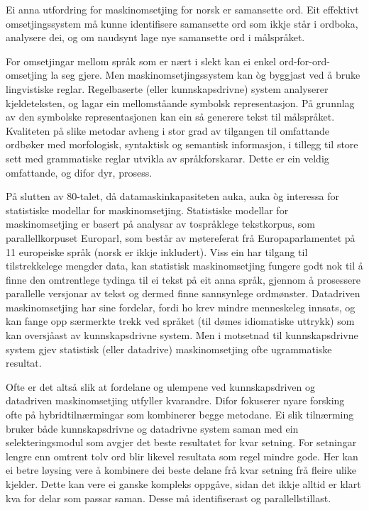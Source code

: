 \begin{multicols}{2}
Ei anna utfordring for maskinomsetjing for norsk er samansette ord. Eit effektivt omsetjingssystem må kunne identifisere samansette ord som ikkje står i ordboka, analysere dei, og om naudsynt lage nye samansette ord i målspråket.

For omsetjingar mellom språk som er nært i slekt kan ei enkel ord-for-ord-omsetjing la seg gjere. Men maskinomsetjingssystem kan òg byggjast ved å bruke lingvistiske reglar. Regelbaserte (eller kunnskapsdrivne) system analyserer kjeldeteksten, og lagar ein mellomståande symbolsk representasjon. På grunnlag av den symbolske representasjonen kan ein så generere tekst til målspråket. Kvaliteten på slike metodar avheng i stor grad av tilgangen til omfattande ordbøker med morfologisk, syntaktisk og semantisk informasjon, i tillegg til store sett med grammatiske reglar utvikla av språkforskarar. Dette er ein veldig omfattande, og difor dyr, prosess.

På slutten av 80-talet, då datamaskinkapasiteten auka, auka òg interessa for statistiske modellar for maskinomsetjing. Statistiske modellar for maskinomsetjing er basert på analysar av tospråklege tekstkorpus, som parallellkorpuset Europarl, som består av møtereferat frå Europaparlamentet på 11 europeiske språk 
(norsk er ikkje inkludert).
Viss ein har tilgang til tilstrekkelege mengder data, kan statistisk maskinomsetjing fungere godt nok til å finne den omtrentlege tydinga til ei tekst på eit anna språk, gjennom å prosessere parallelle versjonar av tekst og dermed finne sannsynlege ordmønster. Datadriven maskinomsetjing har sine fordelar, fordi ho krev mindre menneskeleg innsats, og kan fange opp særmerkte trekk ved språket (til dømes idiomatiske uttrykk) som kan oversjåast av kunnskapsdrivne system. Men i motsetnad til kunnskapsdrivne system gjev statistisk (eller datadrive) maskinomsetjing ofte ugrammatiske resultat.  

Ofte er det altså slik at fordelane og ulempene ved kunnskapsdriven og datadriven maskinomsetjing utfyller kvarandre. Difor fokuserer nyare forsking ofte på hybridtilnærmingar som kombinerer begge metodane. Ei slik tilnærming bruker både kunnskapsdrivne og datadrivne system saman med ein selekteringsmodul som avgjer det beste resultatet for kvar setning. For setningar lengre enn omtrent tolv ord blir likevel resultata som regel mindre gode. Her kan ei betre løysing vere å kombinere dei beste delane frå kvar setning frå fleire ulike kjelder. Dette kan vere ei ganske kompleks oppgåve, sidan det ikkje alltid er klart kva for delar som passar saman. Desse må identifiserast og parallellstillast.   


\end{multicols}
